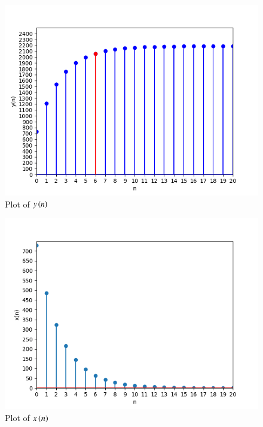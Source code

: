 \documentclass[journal,12pt,twocolumn]{IEEEtran}
\theoremstyle{remark}
\begin{document}
\begin{figure}\label{fig:fig1}
\centering
\begin{center}
\includegraphics[width=\columnwidth]{Figure_1}
\end{center}
\caption{Plot of $y\left(n\right)$}
\end{figure}
\begin{figure}\label{fig:fig2}
\centering
\begin{center}
\includegraphics[width=\columnwidth]{Figure_2}
\end{center}
\caption{Plot of $x\left(n\right)$}
\end{figure}
\end{document}
